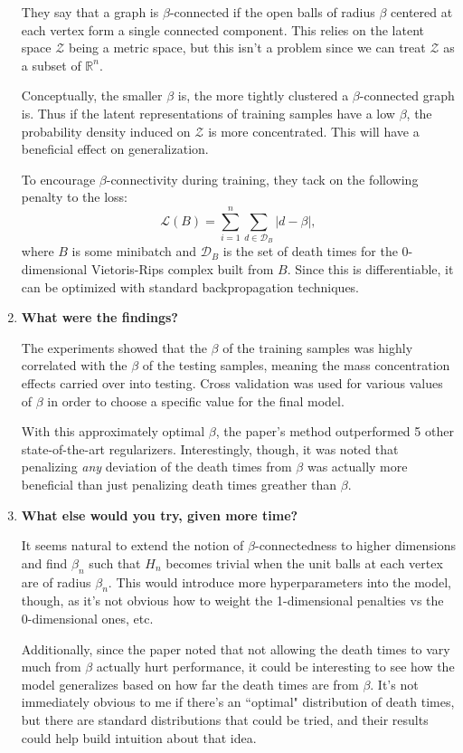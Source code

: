 \documentclass[twoside,10pt]{article}
\begin{document}
\begin{enumerate}
		They say that a graph is $\beta$-connected if the open balls of radius $\beta$ centered at each vertex form a single connected component. This relies on the latent space $\mathcal{Z}$ being a metric space, but this isn't a problem since we can treat $\mathcal{Z}$ as a subset of $\mathbb{R}^{n}$.

		Conceptually, the smaller $\beta$ is, the more tightly clustered a $\beta$-connected graph is. Thus if the latent representations of training samples have a low $\beta$, the probability density induced on $\mathcal{Z}$ is more concentrated. This will have a beneficial effect on generalization.

		To encourage $\beta$-connectivity during training, they tack on the following penalty to the loss:
		\[
			\mathcal{L}(B) = \sum_{i=1}^{n} \sum_{d \in \mathcal{D}_B} |d-\beta|,
		\] where $B$ is some minibatch and $\mathcal{D}_B$ is the set of death times for the 0-dimensional Vietoris-Rips complex built from $B$. Since this is differentiable, it can be optimized with standard backpropagation techniques.

	\item \textbf{What were the findings?}

		The experiments showed that the $\beta$ of the training samples was highly correlated with the $\beta$ of the testing samples, meaning the mass concentration effects carried over into testing. Cross validation was used for various values of $\beta$ in order to choose a specific value for the final model.

		With this approximately optimal $\beta$, the paper's method outperformed 5 other state-of-the-art regularizers. Interestingly, though, it was noted that penalizing \textit{any} deviation of the death times from $\beta$ was actually more beneficial than just penalizing death times greather than $\beta$.

	\item \textbf{What else would you try, given more time?}

		It seems natural to extend the notion of $\beta$-connectedness to higher dimensions and find $\beta_n$ such that $H_{n}$ becomes trivial when the unit balls at each vertex are of radius $\beta_n$. This would introduce more hyperparameters into the model, though, as it's not obvious how to weight the 1-dimensional penalties vs the 0-dimensional ones, etc.

		Additionally, since the paper noted that not allowing the death times to vary much from $\beta$ actually hurt performance, it could be interesting to see how the model generalizes based on how far the death times are from $\beta$. It's not immediately obvious to me if there's an ``optimal" distribution of death times, but there are standard distributions that could be tried, and their results could help build intuition about that idea.
\end{enumerate}
\end{document}
